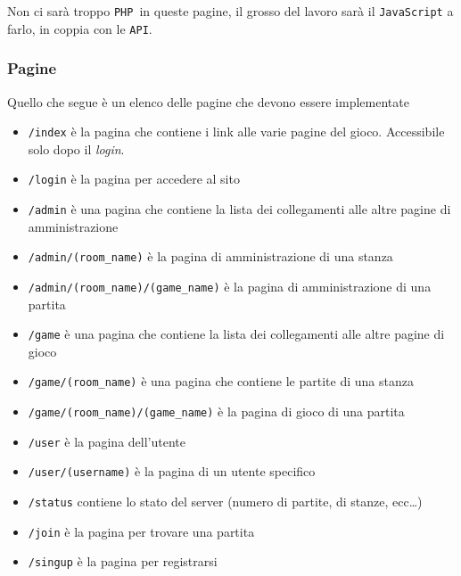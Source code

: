 \documentclass[10pt,a4paper]{article}
\newcommand{\pageurl}[1]{\small\texttt{#1}}
\newcommand{\lang}[1]{\texttt{#1}}
\newcommand{\PHP}{\lang{PHP}}
\newcommand{\API}{\texttt{API}}
\begin{document}
Non ci sarà troppo \PHP\ in queste pagine, il grosso del lavoro sarà il \lang{JavaScript} a farlo, in coppia con le \API.

\subsubsection*{Pagine}
Quello che segue è un elenco delle pagine che devono essere implementate
\begin{itemize}
\item \pageurl{/index} è la pagina che contiene i link alle varie pagine del gioco. Accessibile solo dopo il \emph{login}.
\item \pageurl{/login} è la pagina per accedere al sito
\item \pageurl{/admin} è una pagina che contiene la lista dei collegamenti alle altre pagine di amministrazione 
\item \pageurl{/admin/(room\_name)} è la pagina di amministrazione di una stanza
\item \pageurl{/admin/(room\_name)/(game\_name)} è la pagina di amministrazione di una partita
\item \pageurl{/game} è una pagina che contiene la lista dei collegamenti alle altre pagine di gioco
\item \pageurl{/game/(room\_name)} è una pagina che contiene le partite di una stanza
\item \pageurl{/game/(room\_name)/(game\_name)} è la pagina di gioco di una partita
\item \pageurl{/user} è la pagina dell'utente
\item \pageurl{/user/(username)} è la pagina di un utente specifico
\item \pageurl{/status} contiene lo stato del server (numero di partite, di stanze, ecc\dots)
\item \pageurl{/join} è la pagina per trovare una partita
\item \pageurl{/singup} è la pagina per registrarsi
\end{itemize}

\newpage
\end{document}
